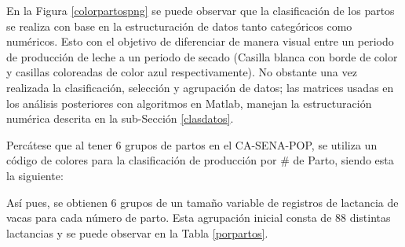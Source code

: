 En la Figura \ref{colorpartospng} se puede observar que la clasificación de los partos se realiza con base en la estructuración de datos tanto categóricos como numéricos. Esto con el objetivo de diferenciar de manera visual entre un periodo de producción de leche a un periodo de secado (Casilla blanca con borde de color y casillas coloreadas de color azul respectivamente). No obstante una vez realizada la clasificación, selección y agrupación de datos; las matrices usadas en los análisis posteriores con algoritmos en Matlab, manejan la estructuración numérica descrita en la sub-Sección \ref{clasdatos}.

Percátese que al tener 6 grupos de partos en el CA-SENA-POP, se utiliza un código de colores para la clasificación de producción por \# de Parto, siendo esta la siguiente:


\begin{table}[H]
\centering
\caption{Código de colores por número de parto}
\label{colorpartos}
\end{table}

Así pues, se obtienen 6 grupos de un tamaño variable de registros de lactancia de vacas para cada número de parto. Esta agrupación inicial consta de 88 distintas lactancias y se puede observar en la Tabla \ref{porpartos}. %

